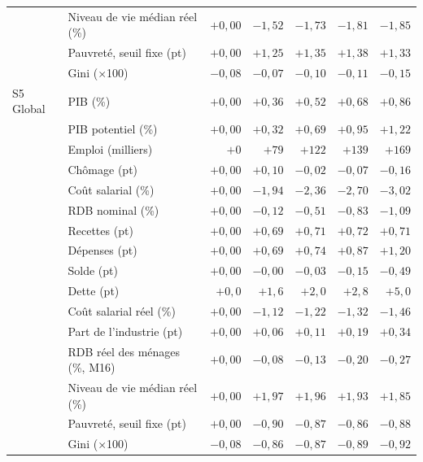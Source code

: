 \begin{longtable}{llrrrrr}
 & Niveau de vie médian réel (\%) & $+0{,}00$ & $-1{,}52$ & $-1{,}73$ & $-1{,}81$ & $-1{,}85$\\
 & Pauvreté, seuil fixe (pt) & $+0{,}00$ & $+1{,}25$ & $+1{,}35$ & $+1{,}38$ & $+1{,}33$\\
 & Gini (×100) & $-0{,}08$ & $-0{,}07$ & $-0{,}10$ & $-0{,}11$ & $-0{,}15$\\
\addlinespace
S5 Global & PIB (\%) & $+0{,}00$ & $+0{,}36$ & $+0{,}52$ & $+0{,}68$ & $+0{,}86$\\
 & PIB potentiel (\%) & $+0{,}00$ & $+0{,}32$ & $+0{,}69$ & $+0{,}95$ & $+1{,}22$\\
 & Emploi (milliers) & $+0$ & $+79$ & $+122$ & $+139$ & $+169$\\
 & Chômage (pt) & $+0{,}00$ & $+0{,}10$ & $-0{,}02$ & $-0{,}07$ & $-0{,}16$\\
 & Coût salarial (\%) & $+0{,}00$ & $-1{,}94$ & $-2{,}36$ & $-2{,}70$ & $-3{,}02$\\
 & RDB nominal (\%) & $+0{,}00$ & $-0{,}12$ & $-0{,}51$ & $-0{,}83$ & $-1{,}09$\\
 & Recettes (pt) & $+0{,}00$ & $+0{,}69$ & $+0{,}71$ & $+0{,}72$ & $+0{,}71$\\
 & Dépenses (pt) & $+0{,}00$ & $+0{,}69$ & $+0{,}74$ & $+0{,}87$ & $+1{,}20$\\
 & Solde (pt) & $+0{,}00$ & $-0{,}00$ & $-0{,}03$ & $-0{,}15$ & $-0{,}49$\\
 & Dette (pt) & $+0{,}0$ & $+1{,}6$ & $+2{,}0$ & $+2{,}8$ & $+5{,}0$\\
 & Coût salarial réel (\%) & $+0{,}00$ & $-1{,}12$ & $-1{,}22$ & $-1{,}32$ & $-1{,}46$\\
 & Part de l'industrie (pt) & $+0{,}00$ & $+0{,}06$ & $+0{,}11$ & $+0{,}19$ & $+0{,}34$\\
 & RDB réel des ménages (\%, M16) & $+0{,}00$ & $-0{,}08$ & $-0{,}13$ & $-0{,}20$ & $-0{,}27$\\
 & Niveau de vie médian réel (\%) & $+0{,}00$ & $+1{,}97$ & $+1{,}96$ & $+1{,}93$ & $+1{,}85$\\
 & Pauvreté, seuil fixe (pt) & $+0{,}00$ & $-0{,}90$ & $-0{,}87$ & $-0{,}86$ & $-0{,}88$\\
 & Gini (×100) & $-0{,}08$ & $-0{,}86$ & $-0{,}87$ & $-0{,}89$ & $-0{,}92$\\\bottomrule\end{longtable}